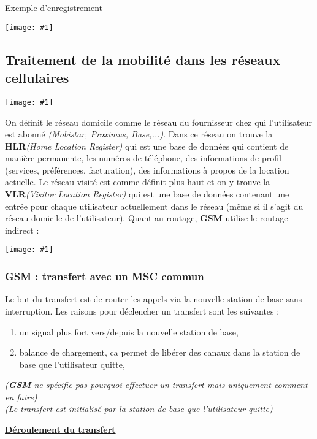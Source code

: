 \documentclass{article}
\newcommand{\imgR}[2]{\begin{center}\texttt{[image: \#1]}\end{center}}
\newcommand{\stitre}[1]{\noindent\textbf{\underline{#1}} \\}
\begin{document}
\noindent\underline{Exemple d'enregistrement}

\imgR{CN_167.png}{400}

\subsection{Traitement de la mobilité dans les réseaux cellulaires}

\imgR{CN_168.png}{200}

On définit le réseau domicile comme le réseau du fournisseur chez qui l'utilisateur est abonné 
\textit{(Mobistar, Proximus, Base,...)}. Dans ce réseau on trouve la \textbf{HLR}\textit{(Home Location 
Register)} qui est une base de données qui contient de manière permanente, les numéros de téléphone, des 
informations de profil (services, préférences, facturation), des informations à propos de la location actuelle. 
Le réseau visité est comme définit plus haut et on y trouve la \textbf{VLR}\textit{(Visitor Location Register)} 
qui est une base de données contenant une entrée pour chaque utilisateur actuellement dans le réseau (même si il
s'agit du réseau domicile de l'utilisateur). Quant au routage, \textbf{GSM} utilise le routage indirect :

\imgR{CN_169.png}{325}

\subsubsection{GSM : transfert avec un MSC commun}

Le but du transfert est de router les appels via la nouvelle station de base sans interruption. Les raisons pour 
déclencher un transfert sont les suivantes : 
\begin{enumerate}
\item un signal plus fort vers/depuis la nouvelle station de base,
\item balance de chargement, ca permet de libérer des canaux dans la station de base que l'utilisateur quitte,
\end{enumerate}
\textit{(\textbf{GSM} ne spécifie pas pourquoi effectuer un transfert mais uniquement comment en faire)}\\
\textit{(Le transfert est initialisé par la station de base que l'utilisateur quitte)} \\

\newpage

\stitre{Déroulement du transfert}
\end{document}
